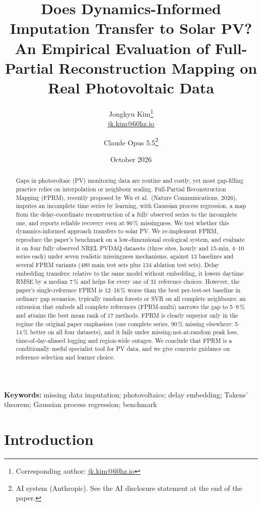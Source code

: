\documentclass[11pt,a4paper]{article}
\title{\textbf{Does Dynamics-Informed Imputation Transfer to Solar PV?}\\[2pt]
\large An Empirical Evaluation of Full-Partial Reconstruction Mapping on Real Photovoltaic Data}
\author{Jongkyu Kim\thanks{Corresponding author: \href{mailto:jk.kim@60hz.io}{jk.kim@60hz.io}}\\\small\href{mailto:jk.kim@60hz.io}{jk.kim@60hz.io}
\and Claude Opus 5.5\thanks{AI system (Anthropic). See the AI disclosure statement at the end of the paper.}}
\date{October 2026}
\newcommand{\pct}{\,\%}
\begin{document}
\maketitle

\begin{abstract}
Gaps in photovoltaic (PV) monitoring data are routine and costly, yet most gap-filling practice relies on interpolation or neighbour scaling.
Full-Partial Reconstruction Mapping (FPRM), recently proposed by Wu et al.\ (Nature Communications, 2026), imputes an incomplete time series by learning, with Gaussian process regression, a map from the delay-coordinate reconstruction of a fully observed series to the incomplete one, and reports reliable recovery even at 90\pct{} missingness.
We test whether this dynamics-informed approach transfers to solar PV.
We re-implement FPRM, reproduce the paper's benchmark on a low-dimensional ecological system, and evaluate it on four fully observed NREL PVDAQ datasets (three sites, hourly and 15-min, 4--10 series each) under seven realistic missingness mechanisms, against 13 baselines and several FPRM variants (480 main test sets plus 134 ablation test sets).
Delay embedding transfers: relative to the same model without embedding, it lowers daytime RMSE by a median 7\pct{} and helps for every one of 31 reference choices.
However, the paper's single-reference FPRM is 12--16\pct{} worse than the best per-test-set baseline in ordinary gap scenarios, typically random forests or SVR on all complete neighbours; an extension that embeds all complete references (FPRM-multi) narrows the gap to 5--9\pct{} and attains the best mean rank of 17 methods.
FPRM is clearly superior only in the regime the original paper emphasises (one complete series, 90\pct{} missing elsewhere: 5--14\pct{} better on all four datasets), and it fails under missing-not-at-random peak loss, time-of-day-aliased logging and region-wide outages.
We conclude that FPRM is a conditionally useful specialist tool for PV data, and we give concrete guidance on reference selection and learner choice.
\end{abstract}

\noindent\textbf{Keywords:} missing data imputation; photovoltaics; delay embedding; Takens' theorem; Gaussian process regression; benchmark

\section{Introduction}\label{sec:intro}
\end{document}
